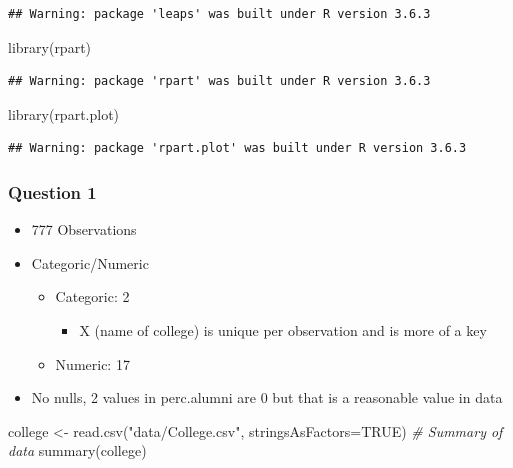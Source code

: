 \documentclass[]{article}
\newenvironment{Shaded}{\begin{snugshade}}{\end{snugshade}}
\newcommand{\AttributeTok}[1]{\textcolor[rgb]{0.77,0.63,0.00}{#1}}
\newcommand{\CommentTok}[1]{\textcolor[rgb]{0.56,0.35,0.01}{\textit{#1}}}
\newcommand{\ConstantTok}[1]{\textcolor[rgb]{0.00,0.00,0.00}{#1}}
\newcommand{\FunctionTok}[1]{\textcolor[rgb]{0.00,0.00,0.00}{#1}}
\newcommand{\NormalTok}[1]{#1}
\newcommand{\OtherTok}[1]{\textcolor[rgb]{0.56,0.35,0.01}{#1}}
\newcommand{\StringTok}[1]{\textcolor[rgb]{0.31,0.60,0.02}{#1}}
\providecommand{\tightlist}{%
  \setlength{\itemsep}{0pt}\setlength{\parskip}{0pt}}
\begin{document}
\begin{verbatim}
## Warning: package 'leaps' was built under R version 3.6.3
\end{verbatim}

\begin{Shaded}
\begin{Highlighting}[]
\FunctionTok{library}\NormalTok{(rpart)}
\end{Highlighting}
\end{Shaded}

\begin{verbatim}
## Warning: package 'rpart' was built under R version 3.6.3
\end{verbatim}

\begin{Shaded}
\begin{Highlighting}[]
\FunctionTok{library}\NormalTok{(rpart.plot)}
\end{Highlighting}
\end{Shaded}

\begin{verbatim}
## Warning: package 'rpart.plot' was built under R version 3.6.3
\end{verbatim}

\hypertarget{question-1}{%
\subsubsection{Question 1}\label{question-1}}

\begin{itemize}
\tightlist
\item
  777 Observations
\item
  Categoric/Numeric

  \begin{itemize}
  \tightlist
  \item
    Categoric: 2

    \begin{itemize}
    \tightlist
    \item
      X (name of college) is unique per observation and is more of a key
    \end{itemize}
  \item
    Numeric: 17
  \end{itemize}
\item
  No nulls, 2 values in perc.alumni are 0 but that is a reasonable value
  in data
\end{itemize}

\begin{Shaded}
\begin{Highlighting}[]
\NormalTok{college }\OtherTok{\textless{}{-}} \FunctionTok{read.csv}\NormalTok{(}\StringTok{"data/College.csv"}\NormalTok{, }\AttributeTok{stringsAsFactors=}\ConstantTok{TRUE}\NormalTok{)}
\CommentTok{\# Summary of data}
\FunctionTok{summary}\NormalTok{(college)}
\end{Highlighting}
\end{Shaded}
\end{document}
